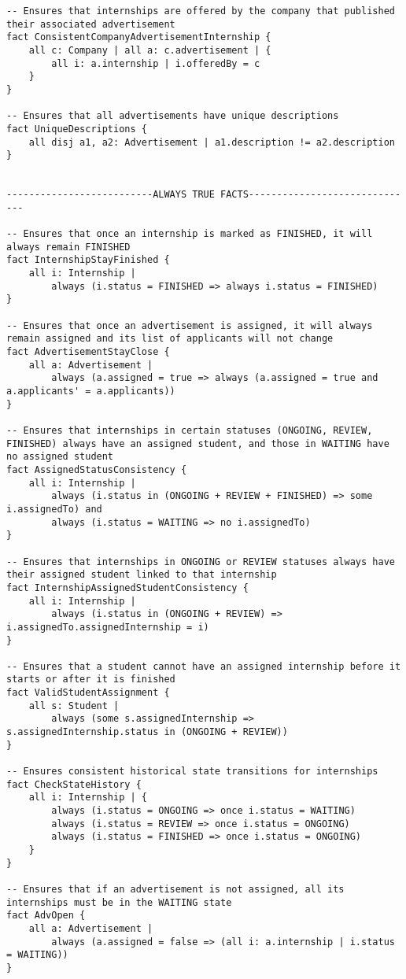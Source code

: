 \begin{lstlisting}
-- Ensures that internships are offered by the company that published their associated advertisement
fact ConsistentCompanyAdvertisementInternship {
    all c: Company | all a: c.advertisement | {
        all i: a.internship | i.offeredBy = c
    }
}

-- Ensures that all advertisements have unique descriptions
fact UniqueDescriptions {
    all disj a1, a2: Advertisement | a1.description != a2.description
}


--------------------------ALWAYS TRUE FACTS------------------------------

-- Ensures that once an internship is marked as FINISHED, it will always remain FINISHED
fact InternshipStayFinished {
    all i: Internship | 
        always (i.status = FINISHED => always i.status = FINISHED)
}

-- Ensures that once an advertisement is assigned, it will always remain assigned and its list of applicants will not change
fact AdvertisementStayClose {
    all a: Advertisement |
        always (a.assigned = true => always (a.assigned = true and a.applicants' = a.applicants))
}

-- Ensures that internships in certain statuses (ONGOING, REVIEW, FINISHED) always have an assigned student, and those in WAITING have no assigned student
fact AssignedStatusConsistency {
    all i: Internship |
        always (i.status in (ONGOING + REVIEW + FINISHED) => some i.assignedTo) and
        always (i.status = WAITING => no i.assignedTo)
}

-- Ensures that internships in ONGOING or REVIEW statuses always have their assigned student linked to that internship
fact InternshipAssignedStudentConsistency {
    all i: Internship |
        always (i.status in (ONGOING + REVIEW) => i.assignedTo.assignedInternship = i)
}

-- Ensures that a student cannot have an assigned internship before it starts or after it is finished
fact ValidStudentAssignment {
    all s: Student | 
        always (some s.assignedInternship => s.assignedInternship.status in (ONGOING + REVIEW))
}

-- Ensures consistent historical state transitions for internships
fact CheckStateHistory {
    all i: Internship | {
        always (i.status = ONGOING => once i.status = WAITING)
        always (i.status = REVIEW => once i.status = ONGOING)
        always (i.status = FINISHED => once i.status = ONGOING)
    }
}

-- Ensures that if an advertisement is not assigned, all its internships must be in the WAITING state
fact AdvOpen {
    all a: Advertisement |
        always (a.assigned = false => (all i: a.internship | i.status = WAITING))
}


\end{lstlisting}
